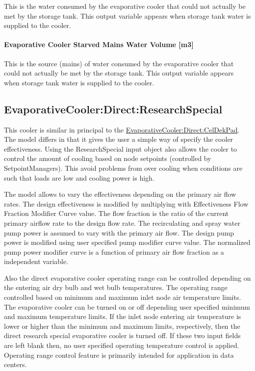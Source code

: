 This is the water consumed by the evaporative cooler that could not actually be met by the storage tank. This output variable appears when storage tank water is supplied to the cooler.

\paragraph{Evaporative Cooler Starved Mains Water Volume {[}m3{]}}\label{evaporative-cooler-starved-mains-water-volume-m3}

This is the source (mains) of water consumed by the evaporative cooler that could not actually be met by the storage tank. This output variable appears when storage tank water is supplied to the cooler.

\subsection{EvaporativeCooler:Direct:ResearchSpecial}\label{evaporativecoolerdirectresearchspecial}

This cooler is similar in principal to the \hyperref[evaporativecoolerdirectceldekpad]{EvaporativeCooler:Direct:CelDekPad}. The model differs in that it gives the user a simple way of specify the cooler effectiveness. Using the ResearchSpecial input object also allows the cooler to control the amount of cooling based on node setpoints (controlled by SetpointManagers). This avoid problems from over cooling when conditions are such that loads are low and cooling power is high.

The model allows to vary the effectiveness depending on the primary air flow rates. The design effectiveness is modified by multiplying with Effectiveness Flow Fraction Modifier Curve value. The flow fraction is the ratio of the current primary airflow rate to the design flow rate. The recirculating and spray water pump power is assumed to vary with the primary air flow. The design pump power is modified using user specified pump modifier curve value. The normalized pump power modifier curve is a function of primary air flow fraction as a independent variable.

Also the direct evaporative cooler operating range can be controlled depending on the entering air dry bulb and wet bulb temperatures. The operating range controlled based on minimum and maximum inlet node air temperature limits. The evaporative cooler can be turned on or off depending user specified minimum and maximum temperature limits. If the inlet node entering air temperature is lower or higher than the minimum and maximum limits, respectively, then the direct research special evaporative cooler is turned off. If these two input fields are left blank then, no user specified operating temperature control is applied. Operating range control feature is primarily intended for application in data centers.

